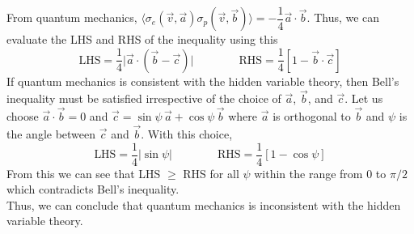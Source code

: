 \documentclass[aps,prb,onecolumn,notitlepage,showpacs,floatfix,superscriptaddress]{revtex4-1}
\begin{document}
From quantum mechanics, $\langle \sigma_e(\vec{v},\vec{a}) \sigma_p(\vec{v},\vec{b})\rangle = -\dfrac{1}{4} \vec{a} \cdot \vec{b}$. Thus, we can evaluate the LHS and RHS of the inequality using this
\begin{equation}
\text{LHS} = \dfrac{1}{4} \vert \vec{a} \cdot (\vec{b}-\vec{c}) \vert \qquad \qquad  \text{RHS} = \dfrac{1}{4} [1-\vec{b}\cdot \vec{c}]   
\end{equation}
If quantum mechanics is consistent with the hidden variable theory, then Bell's inequality must be satisfied irrespective of the choice of $\vec{a}$, $\vec{b}$, and $\vec{c}$. Let us choose $\vec{a}\cdot\vec{b} = 0$ and $\vec{c} = \sin\psi \, \vec{a} + \cos\psi \, \vec{b}$ where $\vec{a}$ is orthogonal to $\vec{b}$ and $\psi$ is the angle between $\vec{c}$ and $\vec{b}$. With this choice,
\begin{equation}
\text{LHS} = \dfrac{1}{4}\vert \sin\psi \vert \qquad \qquad  \text{RHS} = \dfrac{1}{4} [1-\cos\psi]   
\end{equation}
From this we can see that LHS $\geq$ RHS for all $\psi$ within the range from 0 to $\pi/2$ which contradicts Bell's inequality. \\

Thus, we can conclude that quantum mechanics is inconsistent with the hidden variable theory.
\end{document}
